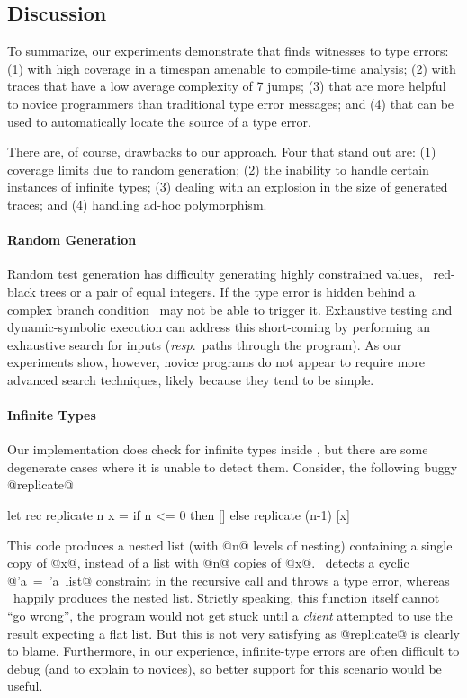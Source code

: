 

\subsection{Discussion}
\label{sec:discussion}

To summarize, our experiments demonstrate that \nanomaly finds witnesses
to type errors:
%
(1) with high coverage in a timespan amenable to compile-time analysis;
%
(2) with traces that have a low average complexity of 7 jumps;
%
(3) that are more helpful to novice programmers than traditional type
error messages; and
%
(4) that can be used to automatically locate the source of a type error.

There are, of course, drawbacks to our approach. Four that stand out
are:
%
(1) coverage limits due to random generation;
%
(2) the inability to handle certain instances of infinite types;
%
(3) dealing with an explosion in the size of generated traces; and
%
(4) handling ad-hoc polymorphism.

\paragraph{Random Generation}
Random test generation has difficulty generating highly constrained
values, \eg\ red-black trees or a pair of equal integers. If the type
error is hidden behind a complex branch condition \nanomaly\ may not be
able to trigger it. Exhaustive testing and dynamic-symbolic execution
can address this short-coming by performing an exhaustive search for
inputs (\emph{resp}.\ paths through the program). As our experiments
show, however, novice programs do not appear to require more advanced
search techniques, likely because they tend to be simple.

\paragraph{Infinite Types}
Our implementation does check for infinite types inside \forcesym, but
there are some degenerate cases where it is unable to detect
them. Consider, the following buggy @replicate@
%
\begin{code}
  let rec replicate n x =
    if n <= 0 then
      []
    else
      replicate (n-1) [x]
\end{code}
%
This code produces a nested list (with @n@ levels of nesting) containing
a single copy of @x@, instead of a list with @n@ copies of @x@. \ocaml\
detects a cyclic \hbox{@'a = 'a list@} constraint in the recursive call
and throws a type error, whereas \nanomaly\ happily %
produces the nested list.  Strictly speaking, this function itself cannot
``go wrong'', the program would not get stuck until a \emph{client}
attempted to use the result expecting a flat list. But this is not very
satisfying as @replicate@ is clearly to blame. Furthermore, in our
experience, infinite-type errors are often difficult to %
debug (and to explain to novices), so better support for this scenario
would be useful.

